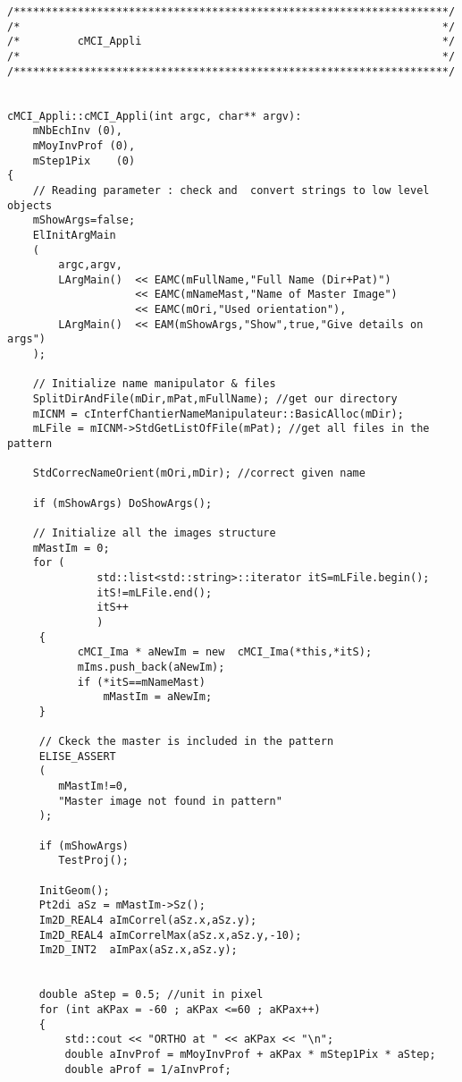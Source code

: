 \documentclass[a4paper]{book}
\begin{document}
\begin{lstlisting}
/********************************************************************/
/*                                                                  */
/*         cMCI_Appli                                               */
/*                                                                  */
/********************************************************************/


cMCI_Appli::cMCI_Appli(int argc, char** argv):
    mNbEchInv (0),
    mMoyInvProf (0),
    mStep1Pix    (0)
{
    // Reading parameter : check and  convert strings to low level objects
    mShowArgs=false;
    ElInitArgMain
    (
        argc,argv,
        LArgMain()  << EAMC(mFullName,"Full Name (Dir+Pat)")
                    << EAMC(mNameMast,"Name of Master Image")
                    << EAMC(mOri,"Used orientation"),
        LArgMain()  << EAM(mShowArgs,"Show",true,"Give details on args")
    );

    // Initialize name manipulator & files
    SplitDirAndFile(mDir,mPat,mFullName); //get our directory
    mICNM = cInterfChantierNameManipulateur::BasicAlloc(mDir);
    mLFile = mICNM->StdGetListOfFile(mPat); //get all files in the pattern

    StdCorrecNameOrient(mOri,mDir); //correct given name

    if (mShowArgs) DoShowArgs();

    // Initialize all the images structure
    mMastIm = 0;
    for (
              std::list<std::string>::iterator itS=mLFile.begin();
              itS!=mLFile.end();
              itS++
              )
     {
           cMCI_Ima * aNewIm = new  cMCI_Ima(*this,*itS);
           mIms.push_back(aNewIm);
           if (*itS==mNameMast)
               mMastIm = aNewIm;
     }

     // Ckeck the master is included in the pattern
     ELISE_ASSERT
     (
        mMastIm!=0,
        "Master image not found in pattern"
     );

     if (mShowArgs)
        TestProj();

     InitGeom();
     Pt2di aSz = mMastIm->Sz();
     Im2D_REAL4 aImCorrel(aSz.x,aSz.y);
     Im2D_REAL4 aImCorrelMax(aSz.x,aSz.y,-10);
     Im2D_INT2  aImPax(aSz.x,aSz.y);


     double aStep = 0.5; //unit in pixel
     for (int aKPax = -60 ; aKPax <=60 ; aKPax++)
     {
         std::cout << "ORTHO at " << aKPax << "\n";
         double aInvProf = mMoyInvProf + aKPax * mStep1Pix * aStep;
         double aProf = 1/aInvProf;


\end{lstlisting}
\end{document}
